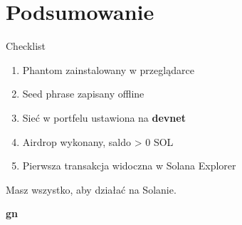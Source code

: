 \section{Podsumowanie}

\begin{frame}{Checklist}
  \begin{enumerate}
    \item[{[\ ]}] Phantom zainstalowany w przeglądarce
    \item[{[\ ]}] Seed phrase zapisany offline
    \item[{[\ ]}] Sieć w portfelu ustawiona na \textbf{devnet}
    \item[{[\ ]}] Airdrop wykonany, saldo \textgreater{} 0 SOL
    \item[{[\ ]}] Pierwsza transakcja widoczna w Solana Explorer
  \end{enumerate}
  \vspace{0.5cm}
  \begin{center}
    \textcolor{stplmuted}{Masz wszystko, aby działać na Solanie.}
  \end{center}
\end{frame}

\begin{frame}[plain]
  \begin{center}
    \vfill
    {\Huge\bfseries\color{stplwhite} gn}
    \vfill
  \end{center}
\end{frame}


